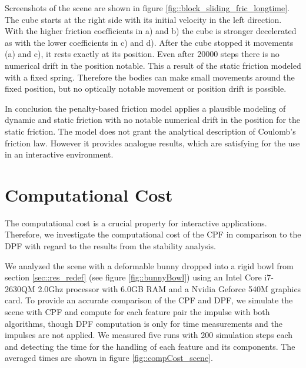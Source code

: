 Screenshots of the scene are shown in figure \ref{fig::block_sliding_fric_longtime}. The cube starts at the right side with its initial velocity in the left direction. With the higher friction coefficients in a) and b) the cube is stronger decelerated as with the lower coefficients in c) and d).
After the cube stopped it movements (a) and c), it rests exactly at its position. Even after 20000 steps there is no numerical drift in the position notable. This a result of the static friction modeled with a fixed spring. Therefore the bodies can make small movements around the fixed position, but no optically notable movement or position drift is possible.

In conclusion the penalty-based friction model \cite{YAMANE2006} applies a plausible modeling of dynamic and static friction with no notable numerical drift in the position for the static friction.
The model does not grant the analytical description of Coulomb's friction law. However it provides analogue results, which are satisfying for the use in an interactive environment.


\section{Computational Cost}
\label{sec:compCost}
The computational cost is a crucial property for interactive applications. Therefore, we investigate the computational cost of the CPF in comparison to the DPF with regard to the results from the stability analysis.
 
We analyzed the scene with a deformable bunny dropped into a rigid bowl from section \ref{sec::res_redef} (see figure \ref{fig::bunnyBowl}) using an Intel Core i7-2630QM 2.0Ghz processor with 6.0GB RAM and a Nvidia Geforce 540M graphics card.
To provide an accurate comparison of the CPF and DPF, we simulate the scene with CPF and compute for each feature pair the impulse with both algorithms, though DPF computation is only for time measurements and the impulses are not applied.
We measured five runs with 200 simulation steps each and detecting the time for the handling of each feature and its components.
The averaged times are shown in figure \ref{fig::compCost_scene}.

